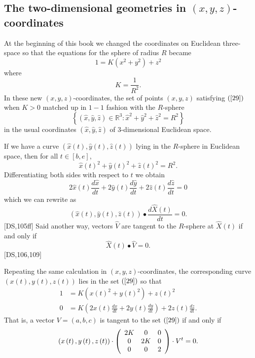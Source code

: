 

\subsection*{The two-dimensional geometries in $\left(x,y,z\right)
$-coordinates}


At the beginning of this book we changed the coordinates on Euclidean
three-space so that the equations for the sphere of radius $R$ became%
\begin{equation}
1=K\left(  x^{2}+y^{2}\right)  +z^{2} \label{29}%
\end{equation}
where%
\[
K=\frac{1}{R^{2}}.
\]
In these new $\left(  x,y,z\right)  $-coordinates, the set of points $\left(
x,y,z\right)  $ satisfying $\left(  \ref{29}\right)  $ when $K>0$ matched up
in $1-1$ fashion with the $R$-sphere%
\[
\left\{  \left(  \hat{x},\hat{y},\hat{z}\right)  \in\mathbb{R}^{3}:\hat{x}%
^{2}+\hat{y}^{2}+\hat{z}^{2}=R^{2}\right\}
\]
in the usual coordinates $\left(  \hat{x},\hat{y},\hat{z}\right)  $ of
$3$-dimensional Euclidean space.

If we have a curve $\left(  \hat{x}\left(  t\right)  ,\hat{y}\left(  t\right)
,\hat{z}\left(  t\right)  \right)  $ lying in the $R$-sphere in Euclidean
space, then for all $t\in\left[  b,e\right]  $,%
\[
\hat{x}\left(  t\right)  ^{2}+\hat{y}\left(  t\right)  ^{2}+\hat{z}\left(
t\right)  ^{2}=R^{2}.
\]
Differentiating both sides with respect to $t$ we obtain%
\[
2\hat{x}\left(  t\right)  \frac{d\hat{x}}{dt}+2\hat{y}\left(  t\right)
\frac{d\hat{y}}{dt}+2\hat{z}\left(  t\right)  \frac{d\hat{z}}{dt}=0
\]
which we can rewrite as%
\[
\left(  \hat{x}\left(  t\right)  ,\hat{y}\left(  t\right)  ,\hat{z}\left(
t\right)  \right)  \bullet\frac{d\hat{X}\left(  t\right)  }{dt}=0.
\]
[DS,105ff] Said another way, vectors $\hat{V}$ are tangent to the $R$-sphere
at $\hat{X}\left(  t\right)  $ if and only if%
\[
\hat{X}\left(  t\right)  \bullet\hat{V}=0.
\]
[DS,106,109]

Repeating the same calculation in $\left(  x,y,z\right)  $-coordinates, the
corresponding curve $\left(  x\left(  t\right)  ,y\left(  t\right)  ,z\left(
t\right)  \right)  $ lies in the set $\left(  \ref{29}\right)  $ so that%
\begin{align*}
1  &  =K\left(  x\left(  t\right)  ^{2}+y\left(  t\right)  ^{2}\right)
+z\left(  t\right)  ^{2}\\
0  &  =K\left(  2x\left(  t\right)  \frac{dx}{dt}+2y\left(  t\right)
\frac{dy}{dt}\right)  +2z\left(  t\right)  \frac{dz}{dt}.
\end{align*}
That is, a vector $V=\left(  a,b,c\right)  $ is tangent to the set $\left(
\ref{29}\right)  $ if and only if%
\begin{equation}
\left(  x\left(  t\right)  ,y\left(  t\right)  ,z\left(  t\right)  \right)
\cdot\left(
\begin{array}
[c]{ccc}%
2K & 0 & 0\\
0 & 2K & 0\\
0 & 0 & 2
\end{array}
\right)  \cdot V^{t}=0. \label{56}%
\end{equation}


